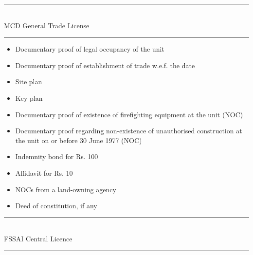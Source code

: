 \documentclass[a4paper, 12pt]{article}
\begin{document}
\noindent\rule{16cm}{0.4pt}\\
MCD General Trade License 
	\\
\noindent\rule{16cm}{0.4pt}
\begin{itemize}[noitemsep]
\item Documentary proof of legal occupancy of the unit 
\item Documentary proof of establishment of trade w.e.f. the date 
\item Site plan 
\item Key plan 
\item Documentary proof of existence of firefighting equipment at the unit (NOC) 
\item Documentary proof regarding non-existence of unauthorised construction at the unit on or before 30 June 1977 (NOC) 
\item Indemnity bond for Rs. 100 
\item Affidavit for Rs. 10 
\item NOCs from a land-owning agency 
\item Deed of constitution, if any 
\end{itemize}
\noindent\rule{16cm}{0.4pt}\\
FSSAI Central Licence \\
\noindent\rule{16cm}{0.4pt}
\end{document}
